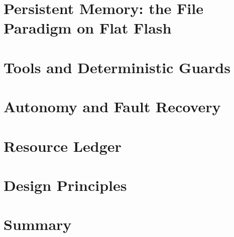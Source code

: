 \section{Persistent Memory: the File Paradigm on Flat Flash}
\label{sec:sys-filememory}

\section{Tools and Deterministic Guards}
\label{sec:sys-guards}

\section{Autonomy and Fault Recovery}
\label{sec:sys-autonomy}

\section{Resource Ledger}
\label{sec:sys-ledger}

\section{Design Principles}
\label{sec:sys-principles}

\section{Summary}
\label{sec:sys-summary}
